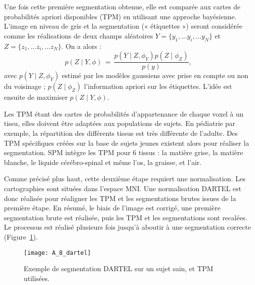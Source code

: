 Une fois cette première segmentation obtenue, elle est comparée aux cartes de probabilités
apriori disponibles (TPM) en utilisant une approche bayésienne. L’image en niveau de gris et la
segmentation (« étiquettes ») seront considérée comme les réalisations de deux champs aléatoires $Y
= \{y_1, ... y_i, ... y_N\}$ et $Z = \{z_1, ... z_i, ... z_N\}$. On a alors :
\begin{equation}
p(Z\mid Y,\phi)\,=\,\frac{p(Y\mid Z,\phi_Y) p(Z\mid \phi_Z)}{p(y)},
\end{equation}
avec $p(Y\mid Z,\phi_Y)$ estimé par les modèles gaussiens avec prise en compte ou non du voisinage ; $p(Z\mid \phi_Z)$
l’information apriori sur les étiquettes. L’idée est ensuite de maximiser $p(Z\mid Y,\phi)$.

Les TPM étant des cartes de probabilités d’appartenance de chaque voxel à un tissu, elles
doivent être adaptées aux populations de sujets. En pédiatrie par exemple, la répartition des différents
tissus est très différente de l’adulte. Des TPM spécifiques créées sur la base de sujets jeunes existent
alors pour réaliser la segmentation. SPM intègre les TPM pour 6 tissus : la matière grise, la matière
blanche, le liquide cérébro-spinal et même l’os, la graisse, et l’air.

Comme précisé plus haut, cette deuxième étape requiert une normalisation. Les cartographies
sont situées dans l’espace MNI. Une normalisation DARTEL est donc réalisée pour réaligner les TPM et
les segmentations brutes issues de la première étape. En résumé, le biais de l’image est corrigé, une
première segmentation brute est réalisée, puis les TPM et les segmentations sont recalées. Le
processus est réalisé plusieurs fois jusqu’à aboutir à une segmentation correcte (Figure~\ref{fig:A_8_dartel}).
\begin{figure}[!t]
\centering
\texttt{[image: A\_8\_dartel]}
\caption{Exemple de segmentation DARTEL sur un sujet sain, et TPM utilisées.}
\label{fig:A_8_dartel}	
\end{figure}
